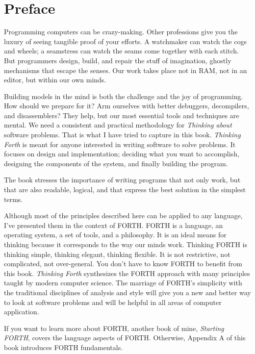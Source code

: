 \chapter*{Preface}

Programming computers can be crazy-making. Other professions give
you the luxury of seeing tangible proof of your efforts. A watchmaker
can watch the cogs and wheels; a seamstress can watch the seams come
together with each stitch. But programmers design, build, and repair
the stuff of imagination, ghostly mechanisms that escape the senses.
Our work takes place not in RAM, not in an editor, but within our
own minds.

Building models in the mind is both the challenge and the joy of programming.
How should we prepare for it? Arm ourselves with better debuggers,
decompilers, and disassemblers? They help, but our most essential
tools and techniques are mental. We need a consistent and practical
methodology for \emph{Thinking about} software problems. That is what
I have tried to capture in this book. \emph{Thinking Forth} is meant
for anyone interested in writing software to solve problems. It focuses
on design and implementation; deciding what you want to accomplish,
designing the components of the system, and finally building the program.

The book stresses the importance of writing programs that not only
work, but that are also readable, logical, and that express the best
solution in the simplest terms.

Although most of the principles described here can be applied to any
language, I've presented them in the context of FORTH. FORTH is a
language, an operating system, a set of tools, and a philosophy. It
is an ideal means for thinking because it corresponds to the way our
minds work. Thinking FORTH is thinking simple, thinking elegant, thinking
flexible. It is not restrictive, not complicated, not over-general.
You don't have to know FORTH to benefit from this book. \emph{Thinking
Forth} synthesizes the FORTH approach with many principles taught
by modern computer science. The marriage of FORTH's simplicity with
the traditional disciplines of analysis and style will give you a
new and better way to look at software problems and will be helpful
in all areas of computer application.

If you want to learn more about FORTH, another book of mine, \emph{Starting
FORTH}, covers the language aspects of FORTH. Otherwise, Appendix
A of this book introduces FORTH fundamentals.

